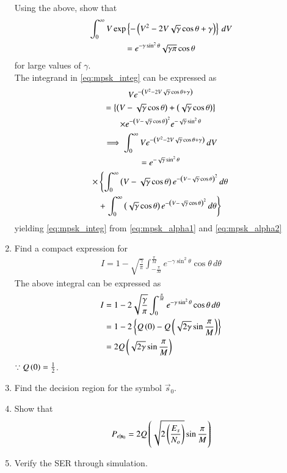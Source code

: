 \documentclass[journal,12pt,twocolumn]{IEEEtran}
\renewcommand\thesection{\arabic{section}}
\begin{document}
\begin{enumerate}[label=\arabic*.,ref=\thesection.\theenumi]
Using the above, show that
%
\begin{multline}
\label{eq:mpsk_integ}
\int_{0}^{\infty}V\exp\left\{-\left(V^2 - 2V \sqrt{\gamma}\cos \theta +\gamma\right)\right\}\,dV
\\
= e^{-\gamma\sin^2 \theta} \sqrt{\gamma\pi}\cos \theta
\end{multline}
%
for large values of $\gamma$.
\\
\solution The integrand in \eqref{eq:mpsk_integ} can be expressed as
\begin{multline}
Ve^{-\left(V^2 - 2V \sqrt{\gamma}\cos \theta +\gamma\right)} 
\\
= \left\{\left(V - \sqrt{\gamma}\cos \theta\right) + \left(\sqrt{\gamma}\cos \theta\right)\right\}
\\
\times e^{-\left(V -  \sqrt{\gamma}\cos \theta \right)^2}e^{-  \sqrt{\gamma}\sin^2 \theta} 
\\
\implies \int_{0}^{\infty}Ve^{-\left(V^2 - 2V \sqrt{\gamma}\cos \theta +\gamma\right)}\,dV
\\
 = e^{-  \sqrt{\gamma}\sin^2 \theta}
\\
\times  \left\{\int_{0}^{\infty}\left(V - \sqrt{\gamma}\cos \theta\right)e^{-\left(V -  \sqrt{\gamma}\cos \theta \right)^2}\,d\theta\right.
\\
+ \left.\int_{0}^{\infty}\left(\sqrt{\gamma}\cos \theta\right)e^{-\left(V -  \sqrt{\gamma}\cos \theta \right)^2}\,d \theta\right\}
\end{multline}
%
yielding \eqref{eq:mpsk_integ} from \eqref{eq:mpsk_alpha1}
and \eqref{eq:mpsk_alpha2}


\item

Find a compact expression for
%
\begin{align}
I = 1 - \sqrt{\frac{\gamma}{\pi}}\int_{-\frac{\pi}{M}}^{\frac{\pi}{M}}e^{- \gamma\sin^2\theta }\cos \theta\, d\theta
\end{align}
\solution The above integral can be expressed as
%
\begin{align}
I &= 1 - 2\sqrt{\frac{\gamma}{\pi}}\int_{0}^{\frac{\pi}{M}}e^{- \gamma\sin^2\theta }\cos \theta\, d\theta
\\
&= 1 - 2 \left\{Q\left(0\right)-Q\left(\sqrt{2\gamma}\sin \frac{\pi}{M}\right)\right\}
\\
&= 2Q\left(\sqrt{2\gamma}\sin \frac{\pi}{M}\right)
\end{align}
$\because Q\left(0\right) = \frac{1}{2}$.
\item Find the decision region for the symbol $\vec{s}_0$.

\item

Show that
\begin{equation}
P_{e|\mathbf{s}_0}=2Q\left(\sqrt{2\left(\frac{{E_s}}{N_o}\right)}\sin \frac{\pi}{M}\right)
\end{equation}
\item

Verify the SER through simulation.
\end{enumerate}
%
\end{document}
